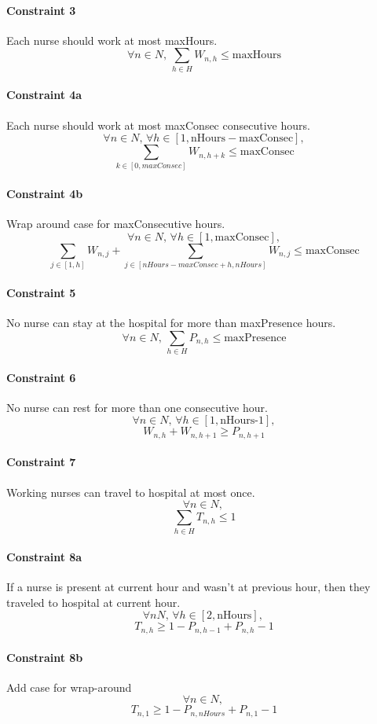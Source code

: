 \documentclass[12pt,a4paper]{article}
\begin{document}
\paragraph{Constraint 3} Each nurse should work at most maxHours.
$$ \forall n \in N,\, \sum_{h \in H} W_{n,h} \le \textrm{maxHours} $$
%
\paragraph{Constraint 4a} Each nurse should work at most maxConsec consecutive
hours.
$$ \forall n \in N,\, \forall h \in [1, \textrm{nHours} - \textrm{maxConsec}],$$
$$\sum_{k \in [0, maxConsec]} W_{n, h+k} \le \textrm{maxConsec}
$$
%
\paragraph{Constraint 4b} Wrap around case for maxConsecutive hours.
$$ \forall n \in N,\, \forall h \in [1, \textrm{maxConsec}],$$
$$\sum_{j \in [1, h]} W_{n, j} +
	\sum_{j \in [nHours-maxConsec+h, nHours]} W_{n, j}  \le \textrm{maxConsec}
$$
%
\paragraph{Constraint 5} No nurse can stay at the hospital for more than
maxPresence hours.
$$ \forall n \in N, \, \sum_{h \in H} P_{n,h} \le \textrm{maxPresence} $$
%
\paragraph{Constraint 6} No nurse can rest for more than one consecutive hour.
$$ \forall n \in N,\, \forall h \in [1, \textrm{nHours-1}],$$
$$W_{n, h} + W_{n, h+1} \ge P_{n,h+1} $$
%
\paragraph{Constraint 7} Working nurses can travel to hospital at most once.
$$ \forall n \in N,\,$$
$$ \sum_{h \in H} T_{n,h} \le 1 $$
%
\paragraph{Constraint 8a} If a nurse is present at current hour and wasn't at 
previous hour, then they traveled to hospital at current hour.
$$ \forall n N, \,\forall h \in [2, \textrm{nHours}],\,$$
$$ T_{n,h} \ge 1 - P_{n, h-1} + P_{n, h} - 1 $$
%
\paragraph{Constraint 8b} Add case for wrap-around
$$ \forall n \in N,\,$$
$$ T_{n, 1} \ge 1 - P_{n, nHours} + P_{n, 1} - 1 $$
%
\end{document}
